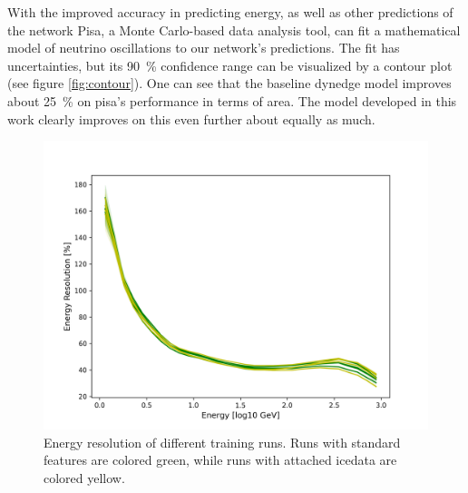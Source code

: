 \documentclass[a4paper,10pt]{scrartcl}
\begin{document}
With the improved accuracy in predicting energy, as well as other predictions of the network Pisa, a Monte Carlo-based data analysis tool, can fit a mathematical model of neutrino oscillations to our network's predictions.
The fit has uncertainties, but its \SI{90}{\%} confidence range can be visualized by a contour plot (see figure \ref{fig:contour}).
One can see that the baseline dynedge model improves about \SI{25}{\%} on pisa's performance in terms of area.
The model developed in this work clearly improves on this even further about equally as much.


\begin{figure}[h]
    \includegraphics[scale=0.65]{images/results-icedata.png}
    \centering
    \caption{Energy resolution of different training runs. Runs with standard features are colored green, while runs with attached icedata are colored yellow.}
    \label{fig:results-icedata}
\end{figure}
\end{document}
